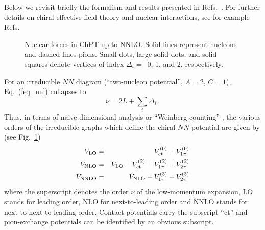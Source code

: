 Below we revisit briefly the formalism and results presented in
Refs.~\cite{ekstromPRX}. For further details on chiral effective
field theory and nuclear interactions, see for example
Refs.~\cite{machleidt2011,epelbaum2009,ekstrom2013,Ekstrom:2015rta,ekstromPRX}
\begin{figure}[t]\centering
\caption{Nuclear forces in ChPT up to NNLO. Solid lines represent
  nucleons and dashed lines pions.  Small dots, large solid dots, and
  solid squares denote vertices of index $\Delta_i= \, $ 0, 1, and 2,
  respectively.}
\label{fig_diagNNLO}
\end{figure}
For an irreducible $NN$ diagram (``two-nucleon potential'', $A=2$,
$C=1$), Eq.~(\ref{eq_nu}) collapses to
\begin{equation} 
\nu = 2L + \sum_i \Delta_i \, .
\label{eq_nunn} 
\end{equation}
Thus, in terms of naive dimensional analysis or ``Weinberg counting''
\cite{weinberg1990}, the various orders of the
irreducible graphs which define the chiral $NN$ potential are given by
(see Fig.~\ref{fig_diagNNLO})
\begin{eqnarray}
V_{\rm LO} & = & V_{\rm ct}^{(0)} + V_{1\pi}^{(0)}
\label{eq_VLO}
\\ V_{\rm NLO} & = & V_{\rm LO} + V_{\rm ct}^{(2)} + V_{1\pi}^{(2)} +
V_{2\pi}^{(2)}
\label{eq_VNLO}
\\ V_{\rm NNLO} & = & V_{\rm NLO} + V_{1\pi}^{(3)} + V_{2\pi}^{(3)}
\label{eq_VNNLO}
\end{eqnarray}
where the superscript denotes the order $\nu$ of the low-momentum
expansion, LO stands for leading order, NLO for next-to-leading order
and NNLO stands for next-to-next-to leading order.  Contact potentials
carry the subscript ``ct'' and pion-exchange potentials can be
identified by an obvious subscript.

